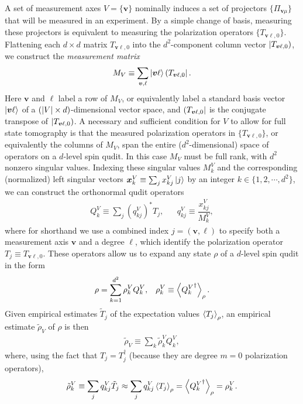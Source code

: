 \documentclass[nofootinbib,twocolumn]{revtex4-1}
\newcommand{\f}[2]{\dfrac{#1}{#2}} %
\newcommand{\p}[1]{\left(#1\right)} %
\newcommand{\bk}{\Braket} %
\renewcommand{\set}[1]{\{#1\}} %
\def\obra#1{\mathinner{({#1}|}}
\def\oket#1{\mathinner{|{#1})}}
\begin{document}
A set of measurement axes $V=\set{\bm v}$ nominally induces a set of projectors $\set{\Pi_{\bm v\mu}}$ that will be measured in an experiment.
By a simple change of basis, measuring these projectors is equivalent to measuring the polarization operators $\set{T_{\bm v\ell,0}}$.
Flattening each $d\times d$ matrix $T_{\bm v\ell,0}$ into the $d^2$-component column vector $\oket{T_{\bm v\ell,0}}$, we construct the {\it measurement matrix}
\begin{align}
  M_V \equiv \sum_{\bm v,\ell} \ket{\bm v\ell} \obra{T_{\bm v\ell,0}}.
  \label{eq:meas_mat}
\end{align}
Here $\bm v$ and $\ell$ label a row of $M_V$, or equivalently label a standard basis vector $\ket{\bm v\ell}$ of a $\p{\abs{V}\times d}$-dimensional vector space, and $\obra{T_{\bm v\ell,0}}$ is the conjugate transpose of $\oket{T_{\bm v\ell,0}}$.
A necessary and sufficient condition for $V$ to allow for full state tomography is that the measured polarization operators in $\set{T_{\bm v\ell,0}}$, or equivalently the columns of $M_V$, span the entire ($d^2$-dimensional) space of operators on a $d$-level spin qudit.
In this case $M_V$ must be full rank, with $d^2$ nonzero singular values.
Indexing these singular values $M^V_k$ and the corresponding (normalized) left singular vectors $\bm x^V_k\equiv \sum_j x^V_{kj} \ket{j}$ by an integer $k\in\set{1,2,\cdots,d^2}$, we can construct the orthonormal qudit operators
\begin{align}
  Q^V_k \equiv \sum_j \p{q^V_{kj}}^* T_j,
  &&
  q^V_{kj} \equiv \f{x^V_{kj}}{M^V_k},
\end{align}
where for shorthand we use a combined index $j=\p{\bm v,\ell}$ to specify both a measurement axis $\bm v$ and a degree $\ell$, which identify the polarization operator $T_j\equiv T_{\bm v\ell,0}$.
These operators allow us to expand any state $\rho$ of a $d$-level spin qudit in the form
\begin{align}
  \rho = \sum_{k=1}^{d^2} \rho_k^V Q_k^V,
  &&
  \rho_k^V \equiv \bk{{Q^V_k}^\dag}_\rho.
\end{align}
Given empirical estimates $\tilde T_j$ of the expectation values $\bk{T_j}_\rho$, an empirical estimate $\tilde\rho_V$ of $\rho$ is then
\begin{align}
  \tilde\rho_V \equiv \sum_k \tilde\rho^V_k Q^V_k,
  \label{eq:reconstructed_state}
\end{align}
where, using the fact that $T_j=T_j^\dag$ (because they are degree $m=0$ polarization operators),
\begin{align}
  \tilde\rho^V_k \equiv \sum_j q^V_{kj} \tilde T_j
  \approx \sum_j q^V_{kj} \bk{T_j}_\rho
  = \bk{{Q^V_k}^\dag}_\rho
  = \rho^V_k.
\end{align}
\end{document}

